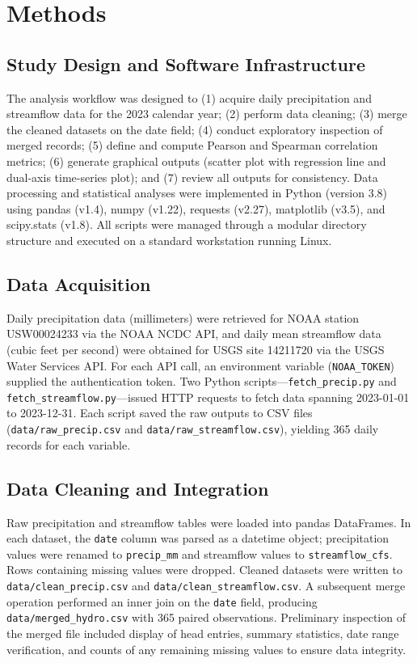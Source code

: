 \documentclass[preprint,12pt]{elsarticle}
\begin{document}
\section{Methods}

\subsection{Study Design and Software Infrastructure}
The analysis workflow was designed to (1) acquire daily precipitation and streamflow data for the 2023 calendar year; (2) perform data cleaning; (3) merge the cleaned datasets on the date field; (4) conduct exploratory inspection of merged records; (5) define and compute Pearson and Spearman correlation metrics; (6) generate graphical outputs (scatter plot with regression line and dual-axis time-series plot); and (7) review all outputs for consistency. Data processing and statistical analyses were implemented in Python (version 3.8) using pandas (v1.4), numpy (v1.22), requests (v2.27), matplotlib (v3.5), and scipy.stats (v1.8). All scripts were managed through a modular directory structure and executed on a standard workstation running Linux.

\subsection{Data Acquisition}
Daily precipitation data (millimeters) were retrieved for NOAA station USW00024233 via the NOAA NCDC API, and daily mean streamflow data (cubic feet per second) were obtained for USGS site 14211720 via the USGS Water Services API. For each API call, an environment variable (\texttt{NOAA\_TOKEN}) supplied the authentication token. Two Python scripts—\texttt{fetch\_precip.py} and \texttt{fetch\_streamflow.py}—issued HTTP requests to fetch data spanning 2023-01-01 to 2023-12-31. Each script saved the raw outputs to CSV files (\texttt{data/raw\_precip.csv} and \texttt{data/raw\_streamflow.csv}), yielding 365 daily records for each variable.

\subsection{Data Cleaning and Integration}
Raw precipitation and streamflow tables were loaded into pandas DataFrames. In each dataset, the \texttt{date} column was parsed as a datetime object; precipitation values were renamed to \texttt{precip\_mm} and streamflow values to \texttt{streamflow\_cfs}. Rows containing missing values were dropped. Cleaned datasets were written to \texttt{data/clean\_precip.csv} and \texttt{data/clean\_streamflow.csv}. A subsequent merge operation performed an inner join on the \texttt{date} field, producing \texttt{data/merged\_hydro.csv} with 365 paired observations. Preliminary inspection of the merged file included display of head entries, summary statistics, date range verification, and counts of any remaining missing values to ensure data integrity.
\end{document}
